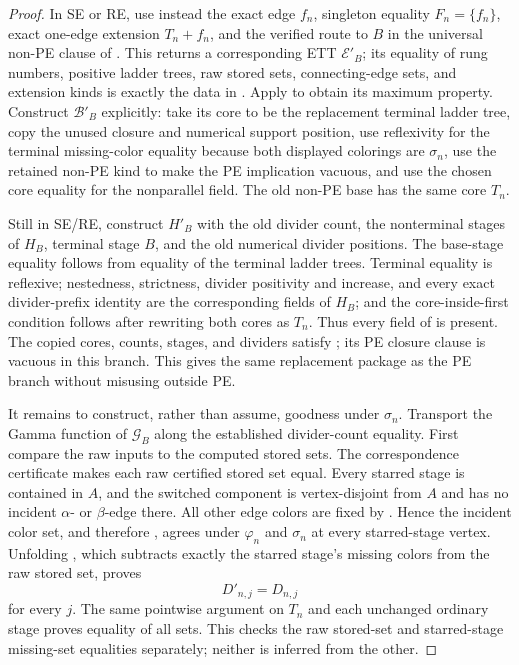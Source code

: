 \begin{proof}
In SE or RE, use instead the exact edge $f_n$, singleton equality
$F_n=\{f_n\}$, exact one-edge extension $T_n+f_n$, and the verified route
to $B$ in the universal non-PE clause of .  This
returns a corresponding ETT $\mathcal E'_B$; its equality of rung
numbers, positive ladder trees, raw stored sets, connecting-edge sets,
and extension kinds is exactly the data in
.  Apply
 to obtain its maximum property.
Construct $\mathcal B'_B$ explicitly: take its core to be the replacement
terminal ladder tree, copy the unused closure and numerical support
position, use reflexivity for the terminal missing-color equality because
both displayed colorings are $\sigma_n$, use the retained non-PE kind to
make the PE implication vacuous, and use the chosen core equality for the
nonparallel field.  The old non-PE base has the same core $T_n$.

Still in SE/RE, construct $H'_B$ with the old divider count, the
nonterminal stages of $H_B$, terminal stage $B$, and the old numerical
divider positions.  The base-stage equality follows from equality of the
terminal ladder trees.  Terminal equality is reflexive; nestedness,
strictness, divider positivity and increase, and every exact
divider-prefix identity are the corresponding fields of $H_B$; and the
core-inside-first condition follows after rewriting both cores as $T_n$.
Thus every field of  is present.  The copied
cores, counts, stages, and dividers satisfy
; its PE closure clause is vacuous in this
branch.  This gives the same replacement package as the PE branch
without misusing  outside PE.

It remains to construct, rather than assume, goodness under $\sigma_n$.
Transport the Gamma function of $\mathcal G_B$ along the established
divider-count equality.  First compare the raw inputs to the computed
stored sets.  The correspondence certificate makes each raw certified
stored set equal.  Every starred stage is contained in $A$, and the
switched component is vertex-disjoint from $A$ and has no incident
$\alpha$- or $\beta$-edge there.  All other edge colors are fixed by
.  Hence the incident color set, and
therefore , agrees under $\varphi_n$ and
$\sigma_n$ at every starred-stage vertex.  Unfolding
, which subtracts exactly the starred
stage's missing colors from the raw stored set, proves
\[
                         D'_{n,j}=D_{n,j}                     \tag{5}
\]
for every $j$.  The same pointwise argument on $T_n$ and each unchanged
ordinary stage proves equality of all
 sets.  This checks the raw
stored-set and starred-stage missing-set equalities separately; neither
is inferred from the other.


\end{proof}
